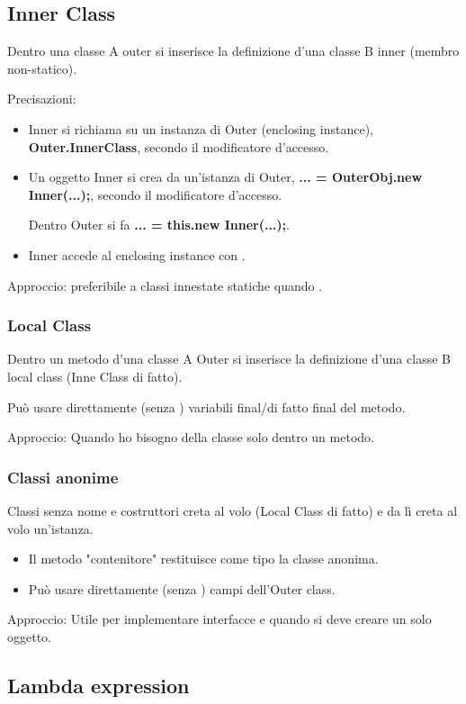 \subsection{Inner Class}
Dentro una classe A outer si inserisce la definizione d'una classe B inner (membro non-statico).


Precisazioni:
\begin{itemize}
	\item Inner si richiama su un instanza di Outer (enclosing instance), \textbf{Outer.InnerClass}, secondo il modificatore d'accesso.
	\item Un oggetto Inner si crea da un'istanza di Outer, \textbf{... = OuterObj.new Inner(...);}, secondo il modificatore d'accesso.

	Dentro Outer si fa \textbf{... = this.new Inner(...);}.
	\item Inner accede al enclosing instance con .
\end{itemize}

Approccio: preferibile a classi innestate statiche quando .

\subsubsection{Local Class}
Dentro un metodo d'una classe A Outer si inserisce la definizione d'una classe B local class (Inne Class di fatto).


Può usare direttamente (senza ) variabili final/di fatto final del metodo.

Approccio: Quando ho bisogno della classe solo dentro un metodo.

\subsubsection{Classi anonime}
Classi senza nome e costruttori creta al volo (Local Class di fatto) e da lì creta al volo un'istanza.


\begin{itemize}
	\item Il metodo "contenitore" restituisce come tipo la classe anonima.
	\item Può usare direttamente (senza ) campi dell'Outer class.
\end{itemize}

Approccio: Utile per implementare interfacce e quando si deve creare un solo oggetto.

\subsection{Lambda expression}
